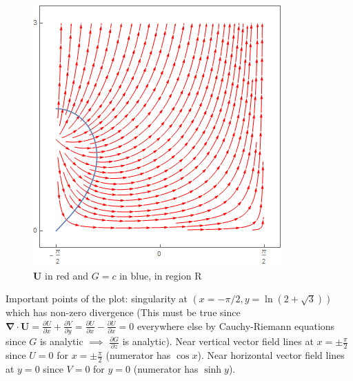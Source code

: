 \documentclass[a4paper]{article}
\begin{document}
\begin{ans}
\begin{enumerate}[label=(\alph*)]
\begin{enumerate}[label=(\roman*)]
\begin{figure}[H]
    \centering
    \includegraphics[scale=0.55]{2016P1Q7.png}
    \caption{$\mathbf{U}$ in red and $G=c$ in blue, in region R}
\end{figure}
Important points of the plot: singularity at $(x=-\pi/2,y=\ln(2+\sqrt{3}))$ which has non-zero divergence (This must be true since $\boldsymbol{\nabla}\cdot\mathbf{U}=\frac{\partial U}{\partial x}+\frac{\partial V}{\partial y}=\frac{\partial U}{\partial x}-\frac{\partial U}{\partial x}=0$ everywhere else by Cauchy-Riemann equations since $G$ is analytic $\implies$ $\frac{\partial G}{\partial z}$ is analytic). Near vertical vector field lines at $x=\pm\frac{\pi}{2}$ since $U=0$ for $x=\pm\frac{\pi}{2}$ (numerator has $\cos x$). Near horizontal vector field lines at $y=0$ since $V=0$ for $y=0$ (numerator has $\sinh y$).
\end{enumerate}
\end{enumerate}
\end{ans}
\end{document}

